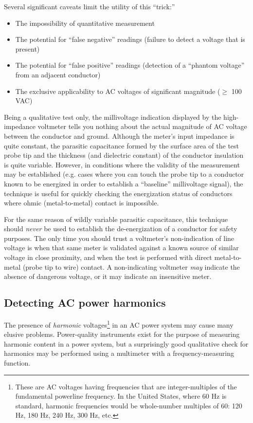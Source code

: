 Several significant caveats limit the utility of this ``trick:''

\begin{itemize}
\item The impossibility of quantitative measurement
\item The potential for ``false negative'' readings (failure to detect a voltage that is present)
\item The potential for ``false positive'' readings (detection of a ``phantom voltage'' from an adjacent conductor)
\item The exclusive applicability to AC voltages of significant magnitude ($\geq$ 100 VAC)
\end{itemize}

Being a qualitative test only, the millivoltage indication displayed by the high-impedance voltmeter tells you nothing about the actual magnitude of AC voltage between the conductor and ground.  Although the meter's input impedance is quite constant, the parasitic capacitance formed by the surface area of the test probe tip and the thickness (and dielectric constant) of the conductor insulation is quite variable.  However, in conditions where the validity of the measurement may be established (e.g. cases where you can touch the probe tip to a conductor known to be energized in order to establish a ``baseline'' millivoltage signal), the technique is useful for quickly checking the energization status of conductors where ohmic (metal-to-metal) contact is impossible.

For the same reason of wildly variable parasitic capacitance, this technique should \textit{never} be used to establish the de-energization of a conductor for safety purposes.  The only time you should trust a voltmeter's non-indication of line voltage is when that same meter is validated against a known source of similar voltage in close proximity, and when the test is performed with direct metal-to-metal (probe tip to wire) contact.  A non-indicating voltmeter \textit{may} indicate the absence of dangerous voltage, or it may indicate an insensitive meter.








\filbreak
\subsection{Detecting AC power harmonics}

The presence of \textit{harmonic} voltages\footnote{These are AC voltages having frequencies that are integer-multiples of the fundamental powerline frequency.  In the United States, where 60 Hz is standard, harmonic frequencies would be whole-number multiples of 60: 120 Hz, 180 Hz, 240 Hz, 300 Hz, etc.} in an AC power system may cause many elusive problems.  Power-quality instruments exist for the purpose of measuring harmonic content in a power system, but a surprisingly good qualitative check for harmonics may be performed using a multimeter with a frequency-measuring function.  

